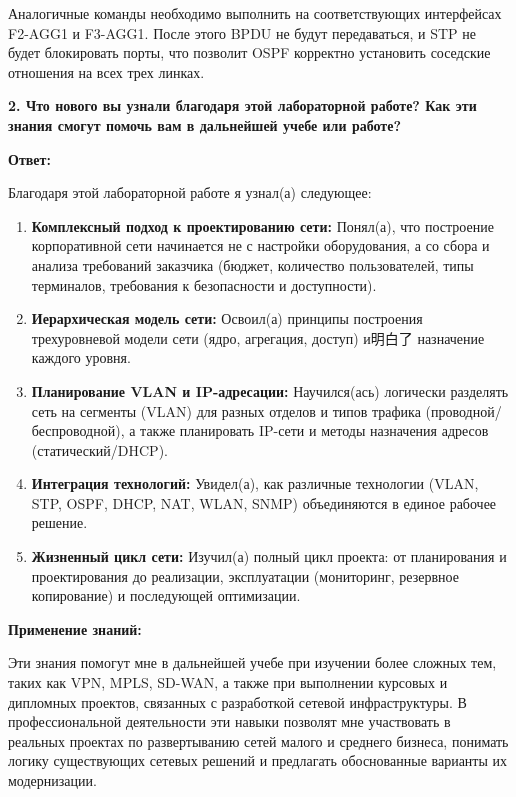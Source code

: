 Аналогичные команды необходимо выполнить на соответствующих интерфейсах F2-AGG1 и F3-AGG1. После этого BPDU не будут передаваться, и STP не будет блокировать порты, что позволит OSPF корректно установить соседские отношения на всех трех линках.

\textbf{2. Что нового вы узнали благодаря этой лабораторной работе? Как эти знания смогут помочь вам в дальнейшей учебе или работе?}

\textbf{Ответ:}

Благодаря этой лабораторной работе я узнал(а) следующее:

\begin{enumerate}
    \item \textbf{Комплексный подход к проектированию сети:} Понял(а), что построение корпоративной сети начинается не с настройки оборудования, а со сбора и анализа требований заказчика (бюджет, количество пользователей, типы терминалов, требования к безопасности и доступности).
    \item \textbf{Иерархическая модель сети:} Освоил(а) принципы построения трехуровневой модели сети (ядро, агрегация, доступ) и明白了 назначение каждого уровня.
    \item \textbf{Планирование VLAN и IP-адресации:} Научился(ась) логически разделять сеть на сегменты (VLAN) для разных отделов и типов трафика (проводной/беспроводной), а также планировать IP-сети и методы назначения адресов (статический/DHCP).
    \item \textbf{Интеграция технологий:} Увидел(а), как различные технологии (VLAN, STP, OSPF, DHCP, NAT, WLAN, SNMP) объединяются в единое рабочее решение.
    \item \textbf{Жизненный цикл сети:} Изучил(а) полный цикл проекта: от планирования и проектирования до реализации, эксплуатации (мониторинг, резервное копирование) и последующей оптимизации.
\end{enumerate}

\textbf{Применение знаний:}

Эти знания помогут мне в дальнейшей учебе при изучении более сложных тем, таких как VPN, MPLS, SD-WAN, а также при выполнении курсовых и дипломных проектов, связанных с разработкой сетевой инфраструктуры. В профессиональной деятельности эти навыки позволят мне участвовать в реальных проектах по развертыванию сетей малого и среднего бизнеса, понимать логику существующих сетевых решений и предлагать обоснованные варианты их модернизации.